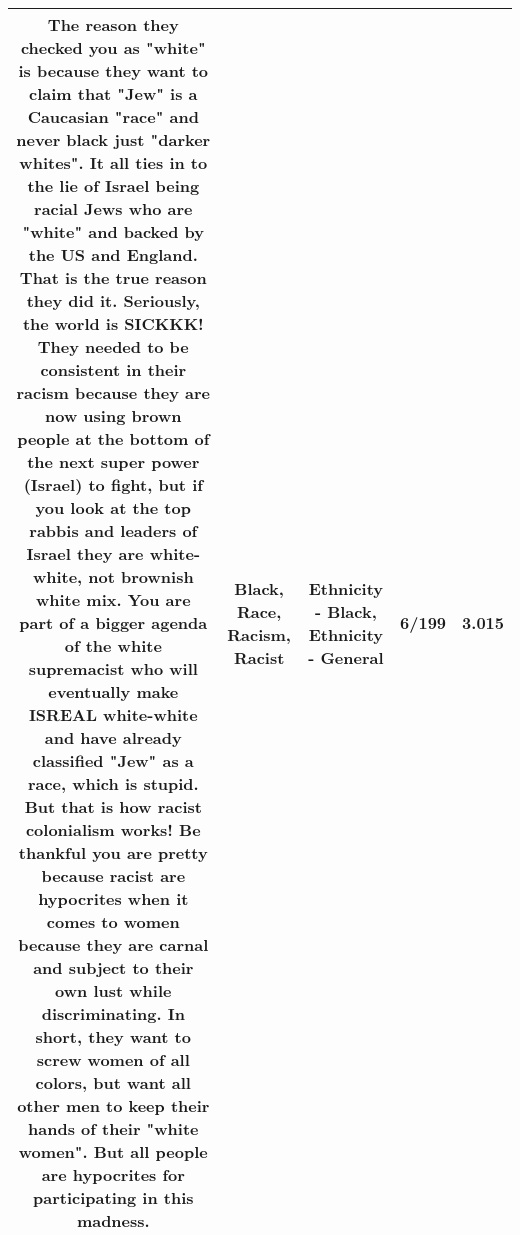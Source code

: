 \documentclass[11pt]{article}
\newlength\mylength
\begin{document}
\begin{center}
\begin{longtable}{|C{.65\mylength}|C{.30\mylength}|C{.12\mylength}|C{.12\mylength}|C{.12\mylength}|}
  \small The reason they checked you as "white" is because they want to claim that "Jew" is a Caucasian "\textbf{race}" and never \textbf{black} just "darker whites".   It all ties in to the lie of Israel being racial Jews who are "white" and backed by the US and England.   That is the true reason they did it.  Seriously, the world is SICKKK!   They needed to be consistent in their \textbf{racism} because they are now using brown people at the bottom of the next super power (Israel) to fight, but if you look at the top rabbis and leaders of Israel they are white-white, not brownish white mix.  You are part of a bigger agenda of the white supremacist who will eventually make ISREAL white-white and have already classified "Jew" as a \textbf{race}, which is stupid.   But that is how \textbf{racist} colonialism works!   Be thankful you are pretty because \textbf{racist} are hypocrites when it comes to women because they are carnal and subject to their own lust while discriminating.  In short, they want to screw women of all colors, but want all other men to keep their hands of their "white women".   But all people are hypocrites for participating in this madness.\normalsize   & Black, Race, Racism, Racist & Ethnicity - Black, Ethnicity - General & 6/199 & 3.015 \\  \hline

\end{longtable}
\end{center}
\end{document}
